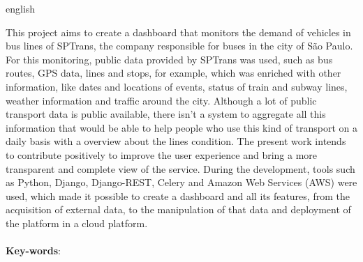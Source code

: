 \begin{resumo}[Abstract]
	\begin{otherlanguage*}{english}
	\indent
	\par This project aims to create a dashboard that monitors the demand of vehicles in bus lines of SPTrans, the company responsible for buses in the city of São Paulo. For this monitoring, public data provided by SPTrans was used, such as bus routes, GPS data, lines and stops, for example, which was enriched with other information, like dates and locations of events, status of train and subway lines, weather information and traffic around the city. Although a lot of public transport data is public available, there isn’t a system to aggregate all this information that would be able to help people who use this kind of transport on a daily basis with a overview about the lines condition. The present work intends to contribute positively to improve the user experience and bring a more transparent and complete view of the service. During the development, tools such as Python, Django, Django-REST, Celery and Amazon Web Services (AWS) were used, which made it possible to create a dashboard and all its features, from the acquisition of external data, to the manipulation of that data and deployment of the platform in a cloud platform.
	\\
	\\
	\textbf{Key-words}: ~
	\end{otherlanguage*}
\end{resumo}
